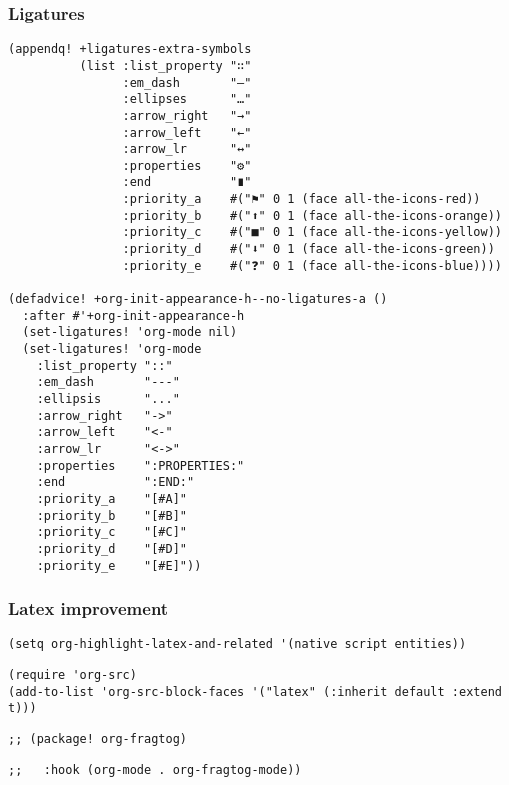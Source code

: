 \documentclass[c]{article}
\theoremstyle{plain}%
\theoremstyle{definition}
\theoremstyle{remark}
\begin{document}
\subsubsection{Ligatures}
\label{sec:org552175e}
\begin{verbatim}
(appendq! +ligatures-extra-symbols
          (list :list_property "∷"
                :em_dash       "—"
                :ellipses      "…"
                :arrow_right   "→"
                :arrow_left    "←"
                :arrow_lr      "↔"
                :properties    "⚙"
                :end           "∎"
                :priority_a    #("⚑" 0 1 (face all-the-icons-red))
                :priority_b    #("⬆" 0 1 (face all-the-icons-orange))
                :priority_c    #("■" 0 1 (face all-the-icons-yellow))
                :priority_d    #("⬇" 0 1 (face all-the-icons-green))
                :priority_e    #("❓" 0 1 (face all-the-icons-blue))))

(defadvice! +org-init-appearance-h--no-ligatures-a ()
  :after #'+org-init-appearance-h
  (set-ligatures! 'org-mode nil)
  (set-ligatures! 'org-mode
    :list_property "::"
    :em_dash       "---"
    :ellipsis      "..."
    :arrow_right   "->"
    :arrow_left    "<-"
    :arrow_lr      "<->"
    :properties    ":PROPERTIES:"
    :end           ":END:"
    :priority_a    "[#A]"
    :priority_b    "[#B]"
    :priority_c    "[#C]"
    :priority_d    "[#D]"
    :priority_e    "[#E]"))
\end{verbatim}
\subsubsection{Latex improvement}
\label{sec:orgfa28eda}
\begin{verbatim}
(setq org-highlight-latex-and-related '(native script entities))
\end{verbatim}
\begin{verbatim}
(require 'org-src)
(add-to-list 'org-src-block-faces '("latex" (:inherit default :extend t)))
\end{verbatim}
\begin{verbatim}
;; (package! org-fragtog)
\end{verbatim}
\begin{verbatim}
;;   :hook (org-mode . org-fragtog-mode))
\end{verbatim}
\end{document}
